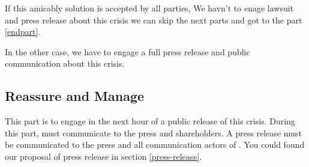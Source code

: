 If this amicably solution is accepted by all parties,  We havn't to enage lawsuit and press release about this crisis we can skip the next parts and got to the part \ref{endpart}.

In the other case, we have to engage a full press release and public communication about this crisis.

\subsection{Reassure and Manage}

This part is to engage in the next hour of a public release of this crisis.
During this part, \moldco must communicate to the press and shareholders.
A press release must be communicated to the press and all communication actors of \moldco.
You could found our proposal of press release in section \ref{press-release}.